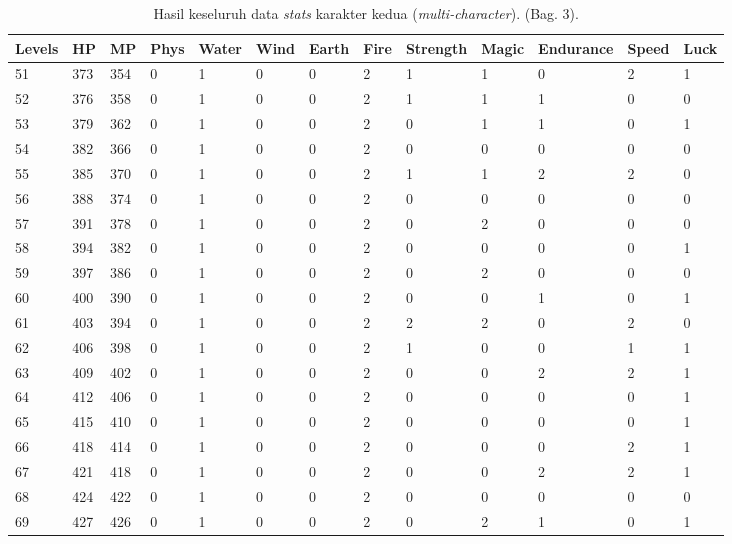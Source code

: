 \begin{sidewaystable}[!h]
	\centering
	\caption{Hasil keseluruh data \textit{stats} karakter kedua (\textit{multi-character}). (Bag. 3).}
	\label{tb:player_all_stats_3_2}
	\vspace{1ex}
	\begin{tabular}{|l|l|l|l|l|l|l|l|l|l|l|l|l|}
		\hline
		\rowcolor[HTML]{C0C0C0} 
		\textbf{Levels} & \textbf{HP} & \textbf{MP} & \textbf{Phys} & \textbf{Water} & \textbf{Wind} & \textbf{Earth} & \textbf{Fire} & \textbf{Strength} & \textbf{Magic} & \textbf{Endurance} & \textbf{Speed} & \textbf{Luck} \\ \hline
		51 & 373 & 354 & 0 & 1 & 0 & 0 & 2 & 1 & 1 & 0 & 2 & 1 \\ \hline
		52 & 376 & 358 & 0 & 1 & 0 & 0 & 2 & 1 & 1 & 1 & 0 & 0 \\ \hline
		53 & 379 & 362 & 0 & 1 & 0 & 0 & 2 & 0 & 1 & 1 & 0 & 1 \\ \hline
		54 & 382 & 366 & 0 & 1 & 0 & 0 & 2 & 0 & 0 & 0 & 0 & 0 \\ \hline
		55 & 385 & 370 & 0 & 1 & 0 & 0 & 2 & 1 & 1 & 2 & 2 & 0 \\ \hline
		56 & 388 & 374 & 0 & 1 & 0 & 0 & 2 & 0 & 0 & 0 & 0 & 0 \\ \hline
		57 & 391 & 378 & 0 & 1 & 0 & 0 & 2 & 0 & 2 & 0 & 0 & 0 \\ \hline
		58 & 394 & 382 & 0 & 1 & 0 & 0 & 2 & 0 & 0 & 0 & 0 & 1 \\ \hline
		59 & 397 & 386 & 0 & 1 & 0 & 0 & 2 & 0 & 2 & 0 & 0 & 0 \\ \hline
		60 & 400 & 390 & 0 & 1 & 0 & 0 & 2 & 0 & 0 & 1 & 0 & 1 \\ \hline
		61 & 403 & 394 & 0 & 1 & 0 & 0 & 2 & 2 & 2 & 0 & 2 & 0 \\ \hline
		62 & 406 & 398 & 0 & 1 & 0 & 0 & 2 & 1 & 0 & 0 & 1 & 1 \\ \hline
		63 & 409 & 402 & 0 & 1 & 0 & 0 & 2 & 0 & 0 & 2 & 2 & 1 \\ \hline
		64 & 412 & 406 & 0 & 1 & 0 & 0 & 2 & 0 & 0 & 0 & 0 & 1 \\ \hline
		65 & 415 & 410 & 0 & 1 & 0 & 0 & 2 & 0 & 0 & 0 & 0 & 1 \\ \hline
		66 & 418 & 414 & 0 & 1 & 0 & 0 & 2 & 0 & 0 & 0 & 2 & 1 \\ \hline
		67 & 421 & 418 & 0 & 1 & 0 & 0 & 2 & 0 & 0 & 2 & 2 & 1 \\ \hline
		68 & 424 & 422 & 0 & 1 & 0 & 0 & 2 & 0 & 0 & 0 & 0 & 0 \\ \hline
		69 & 427 & 426 & 0 & 1 & 0 & 0 & 2 & 0 & 2 & 1 & 0 & 1 \\ \hline

\end{tabular}
\end{sidewaystable}
